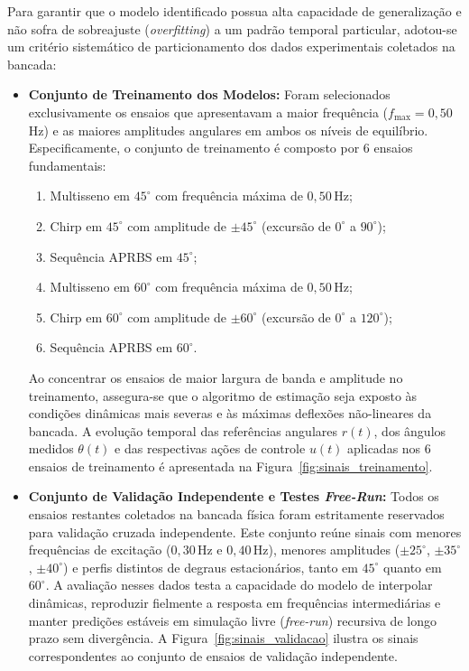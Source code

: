 Para garantir que o modelo identificado possua alta capacidade de generalização e não sofra de sobreajuste (\textit{overfitting}) a um padrão temporal particular, adotou-se um critério sistemático de particionamento dos dados experimentais coletados na bancada:

\begin{itemize}
    \item \textbf{Conjunto de Treinamento dos Modelos:} Foram selecionados exclusivamente os ensaios que apresentavam a maior frequência ($f_{\max} = 0{,}50$\,Hz) e as maiores amplitudes angulares em ambos os níveis de equilíbrio. Especificamente, o conjunto de treinamento é composto por 6 ensaios fundamentais:
    \begin{enumerate}
        \item Multisseno em $45^\circ$ com frequência máxima de $0{,}50$\,Hz;
        \item Chirp em $45^\circ$ com amplitude de $\pm 45^\circ$ (excursão de $0^\circ$ a $90^\circ$);
        \item Sequência APRBS em $45^\circ$;
        \item Multisseno em $60^\circ$ com frequência máxima de $0{,}50$\,Hz;
        \item Chirp em $60^\circ$ com amplitude de $\pm 60^\circ$ (excursão de $0^\circ$ a $120^\circ$);
        \item Sequência APRBS em $60^\circ$.
    \end{enumerate}
    Ao concentrar os ensaios de maior largura de banda e amplitude no treinamento, assegura-se que o algoritmo de estimação seja exposto às condições dinâmicas mais severas e às máximas deflexões não-lineares da bancada. A evolução temporal das referências angulares $r(t)$, dos ângulos medidos $\theta(t)$ e das respectivas ações de controle $u(t)$ aplicadas nos 6 ensaios de treinamento é apresentada na Figura~\ref{fig:sinais_treinamento}.
    
    \item \textbf{Conjunto de Validação Independente e Testes \textit{Free-Run}:} Todos os ensaios restantes coletados na bancada física foram estritamente reservados para validação cruzada independente. Este conjunto reúne sinais com menores frequências de excitação ($0{,}30$\,Hz e $0{,}40$\,Hz), menores amplitudes ($\pm 25^\circ$, $\pm 35^\circ$, $\pm 40^\circ$) e perfis distintos de degraus estacionários, tanto em $45^\circ$ quanto em $60^\circ$. A avaliação nesses dados testa a capacidade do modelo de interpolar dinâmicas, reproduzir fielmente a resposta em frequências intermediárias e manter predições estáveis em simulação livre (\textit{free-run}) recursiva de longo prazo sem divergência. A Figura~\ref{fig:sinais_validacao} ilustra os sinais correspondentes ao conjunto de ensaios de validação independente.
\end{itemize}

